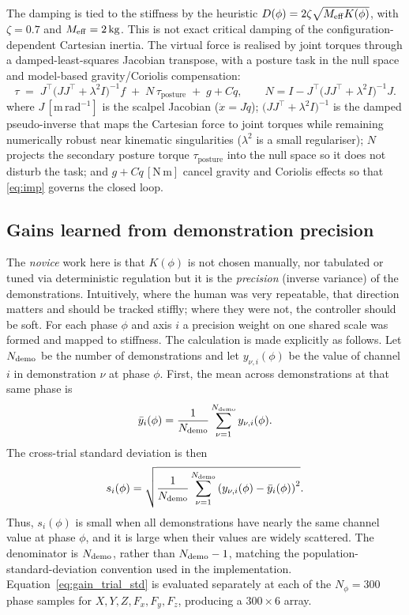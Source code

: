 \documentclass[11pt,a4paper]{article}
\newcommand{\unit}[1]{\,[\mathrm{#1}]}
\begin{document}
The damping is tied to the stiffness by the heuristic
$D(\phi)=2\zeta\sqrt{M_{\rm eff}K(\phi)}$, with $\zeta=0.7$ and
$M_{\rm eff}=2\,\mathrm{kg}$. This is not exact critical damping of the
configuration-dependent Cartesian inertia. The virtual force is realised by joint torques through a
damped-least-squares Jacobian transpose, with a posture task in the null space and
model-based gravity/Coriolis compensation:
\begin{equation}
\tau \;=\; J^{\top}\!\big(JJ^{\top}+\lambda^2 I\big)^{-1} f
   \;+\; N\,\tau_{\text{posture}} \;+\; g + C\dot q,
\qquad N = I - J^{\top}\!\big(JJ^{\top}+\lambda^2 I\big)^{-1} J .
\label{eq:torque}
\end{equation}
where $J\unit{m\,rad^{-1}}$ is the scalpel Jacobian ($\dot x=J\dot q$);
$\big(JJ^{\top}+\lambda^2 I\big)^{-1}$ is the damped pseudo-inverse that maps the
Cartesian force to joint torques while remaining numerically robust near kinematic singularities
($\lambda^2$ is a small regulariser); $N$ projects the secondary posture torque
$\tau_{\text{posture}}$ into the null space so it does not disturb the task; and
$g+C\dot q\unit{N\,m}$ cancel gravity and Coriolis effects so that
\eqref{eq:imp} governs the closed loop.

\subsection{Gains learned from demonstration precision}
\label{sec:gains}
The \emph{novice} work here is that $K(\phi)$ is not chosen manually, nor tabulated or tuned via
deterministic regulation but it is the \emph{precision} (inverse variance) of the demonstrations.
Intuitively, where the human was very repeatable, that direction matters and should be tracked stiffly;
where they were not, the controller should be soft. For each phase $\phi$ and axis
$i$ a precision weight on one shared scale was formed and mapped to stiffness.
The calculation is made explicitly as follows. Let $N_{\rm demo}$ be the number
of demonstrations and let $y_{\nu,i}(\phi)$ be the value of channel $i$ in
demonstration $\nu$ at phase $\phi$. First, the mean across demonstrations at
that same phase is
\begin{equation}
\bar y_i(\phi)
=\frac{1}{N_{\rm demo}}\sum_{\nu=1}^{N_{\rm demo}}y_{\nu,i}(\phi).
\label{eq:gain_trial_mean}
\end{equation}
The cross-trial standard deviation is then
\begin{equation}
s_i(\phi)
=\sqrt{\frac{1}{N_{\rm demo}}
\sum_{\nu=1}^{N_{\rm demo}}
\left(y_{\nu,i}(\phi)-\bar y_i(\phi)\right)^2}.
\label{eq:gain_trial_std}
\end{equation}
Thus, $s_i(\phi)$ is small when all demonstrations have nearly the same
channel value at phase $\phi$, and it is large when their values are widely
scattered. The denominator is $N_{\rm demo}$, rather than
$N_{\rm demo}-1$, matching the population-standard-deviation convention used
in the implementation. Equation~\eqref{eq:gain_trial_std} is evaluated
separately at each of the $N_\phi=300$ phase samples for
$X,Y,Z,F_x,F_y,F_z$, producing a $300\times6$ array.
\end{document}
